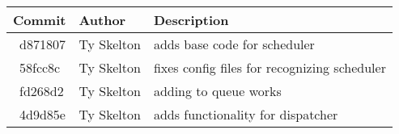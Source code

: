 \begin{tabular}{l l l}\textbf{Commit} & \textbf{Author} & \textbf{Description}\\\hline
\ d871807 & Ty Skelton & adds base code for scheduler\\\hline
\ 58fcc8c & Ty Skelton & fixes config files for recognizing scheduler\\\hline
\ fd268d2 & Ty Skelton & adding to queue works\\\hline
\ 4d9d85e & Ty Skelton & adds functionality for dispatcher\\\hline
\end{tabular}
